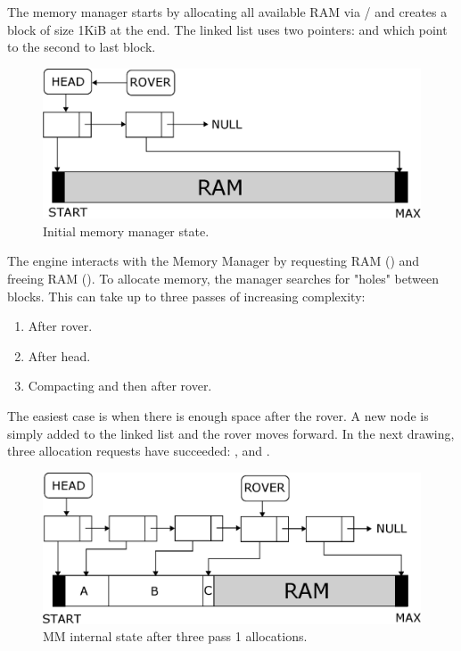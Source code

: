 \documentclass[book.tex]{subfiles}
\begin{document}
The memory manager starts by allocating all available RAM via / and creates a  block of size 1KiB at the end. The linked list uses two pointers:  and  which point to the second to last block.
 \par
\begin{figure}[H]
\centering
 \includegraphics[width=\textwidth]{imgs/drawings/mm_start.eps}
 \caption{Initial memory manager state.}
 \end{figure}
 \par
 The engine interacts with the Memory Manager by requesting RAM () and freeing RAM (). To allocate memory, the manager searches for "holes" between blocks. This can take up to three passes of increasing complexity:
\begin{enumerate}
\item After rover.
\item After head.
\item Compacting and then after rover.
\end{enumerate}
\par
  The easiest case is when there is enough space after the rover. A new node is simply added to the linked list and the rover moves forward. In the next drawing, three allocation requests have succeeded: ,  and .\\
  \par
\begin{figure}[H]
\centering
 \includegraphics[width=\textwidth]{imgs/drawings/mm_after_rover.eps}
 \caption{MM internal state after three pass 1 allocations.}
 \end{figure}
\end{document}
